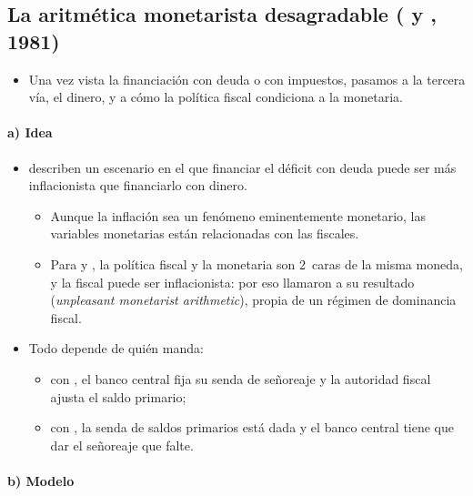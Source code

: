 \documentclass[11pt]{article}
\begin{document}
\subsection{La aritmética monetarista desagradable ( y , 1981)}\label{sec:aritmetica}

\begin{itemize}
\item Una vez vista la financiación con deuda o con impuestos, pasamos a la tercera vía, el dinero, y a cómo la política fiscal condiciona a la monetaria.
\end{itemize}

\paragraph{a) Idea}

\begin{itemize}
\item \textcite{SargentWallace1981Some} describen un escenario en el que financiar el déficit con deuda puede ser más inflacionista que financiarlo con dinero.
  \begin{itemize}
  \item Aunque la inflación sea un fenómeno eminentemente monetario, las variables monetarias están relacionadas con las fiscales.
  \item Para  y , la política fiscal y la monetaria son 2~caras de la misma moneda, y la fiscal puede ser inflacionista: por eso llamaron a su resultado  (\emph{unpleasant monetarist arithmetic}), propia de un régimen de dominancia fiscal.
  \end{itemize}
\item Todo depende de quién manda:
  \begin{itemize}
  \item con , el banco central fija su senda de señoreaje y la autoridad fiscal ajusta el saldo primario;
  \item con , la senda de saldos primarios está dada y el banco central tiene que dar el señoreaje que falte.
  \end{itemize}
\end{itemize}

\paragraph{b) Modelo}
\end{document}
